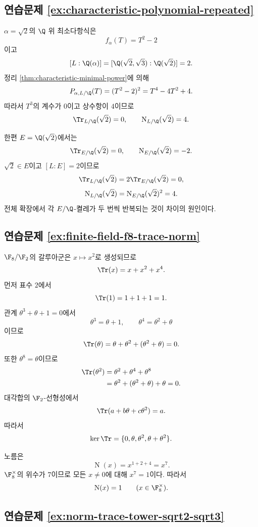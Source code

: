 \subsection*{연습문제 \ref{ex:characteristic-polynomial-repeated}}

\begin{solution}
$\alpha=\sqrt2$의 $\Q$ 위 최소다항식은
\[
  f_\alpha(T)=T^2-2
\]
이고
\[
  [L:\Q(\alpha)]
  =[\Q(\sqrt2,\sqrt3):\Q(\sqrt2)]=2.
\]
정리 \ref{thm:characteristic-minimal-power}에 의해
\[
  P_{\alpha,L/\Q}(T)
  =(T^2-2)^2=T^4-4T^2+4.
\]
따라서 $T^3$의 계수가 $0$이고 상수항이 $4$이므로
\[
  \Tr_{L/\Q}(\sqrt2)=0,
  \qquad
  \operatorname N_{L/\Q}(\sqrt2)=4.
\]

한편 $E=\Q(\sqrt2)$에서는
\[
  \Tr_{E/\Q}(\sqrt2)=0,
  \qquad
  \operatorname N_{E/\Q}(\sqrt2)=-2.
\]
$\sqrt2\in E$이고 $[L:E]=2$이므로
\[
  \Tr_{L/\Q}(\sqrt2)
  =2\Tr_{E/\Q}(\sqrt2)=0,
\]
\[
  \operatorname N_{L/\Q}(\sqrt2)
  =\operatorname N_{E/\Q}(\sqrt2)^2=4.
\]
전체 확장에서 각 $E/\Q$-켤레가 두 번씩 반복되는 것이 차이의 원인이다.
\end{solution}

\subsection*{연습문제 \ref{ex:finite-field-f8-trace-norm}}

\begin{solution}
$\F_8/\F_2$의 갈루아군은 $x\mapsto x^2$로 생성되므로
\[
  \Tr(x)=x+x^2+x^4.
\]
먼저 표수 $2$에서
\[
  \Tr(1)=1+1+1=1.
\]
관계 $\theta^3+\theta+1=0$에서
\[
  \theta^3=\theta+1,
  \qquad
  \theta^4=\theta^2+\theta
\]
이므로
\[
  \Tr(\theta)
  =\theta+\theta^2+(\theta^2+\theta)=0.
\]
또한 $\theta^8=\theta$이므로
\[
\begin{aligned}
  \Tr(\theta^2)
  &=\theta^2+\theta^4+\theta^8\\
  &=\theta^2+(\theta^2+\theta)+\theta=0.
\end{aligned}
\]
대각합의 $\F_2$-선형성에서
\[
  \Tr(a+b\theta+c\theta^2)=a.
\]
따라서
\[
  \ker\Tr
  =\{0,\theta,\theta^2,\theta+\theta^2\}.
\]

노름은
\[
  \operatorname N(x)=x^{1+2+4}=x^7.
\]
$\F_8^\times$의 위수가 $7$이므로 모든 $x\ne0$에 대해 $x^7=1$이다. 따라서
\[
  \operatorname N(x)=1
  \qquad(x\in\F_8^\times).
\]
\end{solution}

\subsection*{연습문제 \ref{ex:norm-trace-tower-sqrt2-sqrt3}}

